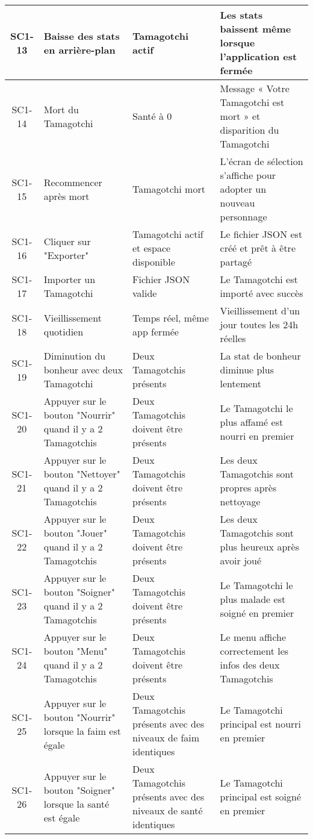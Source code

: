 \documentclass{cahier_de_recette}
\begin{document}
\begin{longtable}{|c|p{4cm}|p{4cm}|p{4cm}|}
\hline
SC1-13 & Baisse des stats en arrière-plan & Tamagotchi actif & Les stats baissent même lorsque l'application est fermée \\
\hline
SC1-14 & Mort du Tamagotchi & Santé à 0 & Message « Votre Tamagotchi est mort » et disparition du Tamagotchi \\
\hline
SC1-15 & Recommencer après mort & Tamagotchi mort & L’écran de sélection s’affiche pour adopter un nouveau personnage \\
\hline
SC1-16 & Cliquer sur "Exporter" & Tamagotchi actif et espace disponible & Le fichier JSON est créé et prêt à être partagé \\
\hline
SC1-17 & Importer un Tamagotchi & Fichier JSON valide & Le Tamagotchi est importé avec succès \\
\hline
SC1-18 & Vieillissement quotidien & Temps réel, même app fermée & Vieillissement d'un jour toutes les 24h réelles \\
\hline
SC1-19 & Diminution du bonheur avec deux Tamagotchi & Deux Tamagotchis présents & La stat de bonheur diminue plus lentement \\
\hline
SC1-20 & Appuyer sur le bouton "Nourrir" quand il y a 2 Tamagotchis & Deux Tamagotchis doivent être présents & Le Tamagotchi le plus affamé est nourri en premier \\
\hline
SC1-21 & Appuyer sur le bouton "Nettoyer" quand il y a 2 Tamagotchis & Deux Tamagotchis doivent être présents & Les deux Tamagotchis sont propres après nettoyage \\
\hline
SC1-22 & Appuyer sur le bouton "Jouer" quand il y a 2 Tamagotchis & Deux Tamagotchis doivent être présents & Les deux Tamagotchis sont plus heureux après avoir joué \\
\hline
SC1-23 & Appuyer sur le bouton "Soigner" quand il y a 2 Tamagotchis & Deux Tamagotchis doivent être présents & Le Tamagotchi le plus malade est soigné en premier \\
\hline
SC1-24 & Appuyer sur le bouton "Menu" quand il y a 2 Tamagotchis & Deux Tamagotchis doivent être présents & Le menu affiche correctement les infos des deux Tamagotchis \\
\hline
SC1-25 & Appuyer sur le bouton "Nourrir" lorsque la faim est égale & Deux Tamagotchis présents avec des niveaux de faim identiques & Le Tamagotchi principal est nourri en premier \\
\hline
SC1-26 & Appuyer sur le bouton "Soigner" lorsque la santé est égale & Deux Tamagotchis présents avec des niveaux de santé identiques & Le Tamagotchi principal est soigné en premier \\
\hline
\end{longtable}
\newpage
\end{document}
